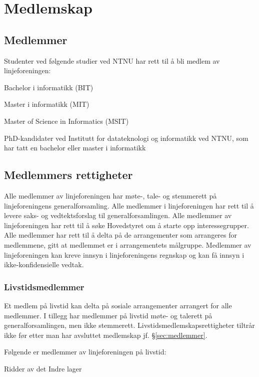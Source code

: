 \chapter{Medlemskap}\label{chapter:medlemskap}

\section{Medlemmer}{\label{sec:medlemmer}
\vspace{23pt}

Studenter ved følgende studier ved NTNU har rett til å bli medlem av linjeforeningen:
\begin{liste}
	\item Bachelor i informatikk (BIT)
	\item Master i informatikk (MIT)
	\item Master of Science in Informatics (MSIT)
    \item PhD-kandidater ved Institutt for datateknologi og informatikk ved NTNU, som har tatt en bachelor eller master i informatikk
\end{liste}
}
\section{Medlemmers rettigheter}
\vspace{23pt}
Alle medlemmer av linjeforeningen har møte-, tale- og stemmerett på linjeforeningens generalforsamling. Alle medlemmer i linjeforeningen har rett til å levere saks- og vedtektsforslag til generalforsamlingen. Alle medlemmer av linjeforeningen har rett til å søke Hovedstyret om å starte opp interessegrupper. Alle medlemmer har rett til å delta på de arrangementer som arrangeres for medlemmene, gitt at medlemmet er i arrangementets målgruppe. Medlemmer av linjeforeningen kan kreve innsyn i linjeforeningens regnskap og kan få innsyn i ikke-konfidensielle vedtak.

\subsection{Livstidsmedlemmer}{
Et medlem på livstid kan delta på sosiale arrangementer arrangert for alle medlemmer. I tillegg har medlemmer på livstid møte- og talerett på generalforsamlingen, men ikke stemmerett. Livstidsmedlemskapsrettigheter tiltrår ikke før etter man har avsluttet medlemskap jf. §\ref{sec:medlemmer}.

Følgende er medlemmer av linjeforeningen på livstid:
\begin{liste}
	\item Ridder av det Indre lager
\end{liste}

}
